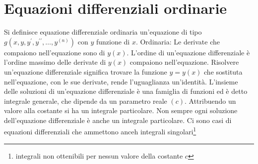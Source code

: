 \chapter{Equazioni differenziali ordinarie}
\begin{defi}
  Si definisce equazione differenziale ordinaria un'equazione di tipo $g(x,y,y^\prime,
  y^{\prime\prime},\dots,y^{(n)})$ con $y$ funzione di $x$. {\color{red}Ordinaria:} Le
  derivate che compaiono nell'equazione sono di $y(x)$. L'ordine di un'equazione
  differenziale è l'ordine massimo delle derivate di $y(x)$ compaiono nell'equazione.
  Risolvere un'equazione differenziale significa trovare la funzione $y=y(x)$ che
  sostituta nell'equazione, con le sue derivate, rende l'uguaglianza un'identità.
  L'insieme delle soluzioni di un'equazione differenziale è una famiglia di funzioni ed è
  detto {\color{red}integrale generale}, che dipende da un parametro reale $(c)$.
  Attribuendo un valore alla costante si ha un {\color{red}integrale particolare}. Non
  sempre ogni soluzione dell'equazione differenziale è anche un integrale particolare.
  Ci sono casi di equazioni differenziali che ammettono anceh integrali singolari\footnote{integrali non ottenibili per nessun valore della costante $c$}
\end{defi}
